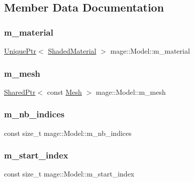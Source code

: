 \subsection{Member Data Documentation}
\hypertarget{classmage_1_1_model_a93e080e5dc2c7c0672a278de76899122}{}\label{classmage_1_1_model_a93e080e5dc2c7c0672a278de76899122} 
\subsubsection{\texorpdfstring{m\+\_\+material}{m\_material}}
{\footnotesize\ttfamily \hyperlink{namespacemage_a8c307fbcc33bce9b7f2aa4c26c3b95cf}{Unique\+Ptr}$<$ \hyperlink{structmage_1_1_shaded_material}{Shaded\+Material} $>$ mage\+::\+Model\+::m\+\_\+material\hspace{0.3cm}{\ttfamily [private]}}

\hypertarget{classmage_1_1_model_aecd2b4031c5df30fb5f7ed6d62810f73}{}\label{classmage_1_1_model_aecd2b4031c5df30fb5f7ed6d62810f73} 
\subsubsection{\texorpdfstring{m\+\_\+mesh}{m\_mesh}}
{\footnotesize\ttfamily \hyperlink{namespacemage_a1e01ae66713838a7a67d30e44c67703e}{Shared\+Ptr}$<$ const \hyperlink{classmage_1_1_mesh}{Mesh} $>$ mage\+::\+Model\+::m\+\_\+mesh\hspace{0.3cm}{\ttfamily [private]}}

\hypertarget{classmage_1_1_model_a1fcf80ed9f3002bd2319ef83f073ae75}{}\label{classmage_1_1_model_a1fcf80ed9f3002bd2319ef83f073ae75} 
\subsubsection{\texorpdfstring{m\+\_\+nb\+\_\+indices}{m\_nb\_indices}}
{\footnotesize\ttfamily const size\+\_\+t mage\+::\+Model\+::m\+\_\+nb\+\_\+indices\hspace{0.3cm}{\ttfamily [private]}}

\hypertarget{classmage_1_1_model_a63a3e697c9eb1606249de15cc7b818c3}{}\label{classmage_1_1_model_a63a3e697c9eb1606249de15cc7b818c3} 
\subsubsection{\texorpdfstring{m\+\_\+start\+\_\+index}{m\_start\_index}}
{\footnotesize\ttfamily const size\+\_\+t mage\+::\+Model\+::m\+\_\+start\+\_\+index\hspace{0.3cm}{\ttfamily [private]}}

